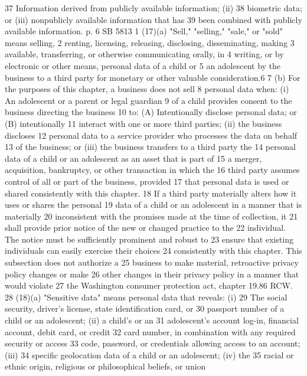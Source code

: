 37 Information derived from publicly available information; (ii)
38 biometric data; or (iii) nonpublicly available information that has
39 been combined with publicly available information.
p. 6 SB 5813
1 (17)(a) "Sell," "selling," "sale," or "sold" means selling,
2 renting, licensing, releasing, disclosing, disseminating, making
3 available, transferring, or otherwise communicating orally, in
4 writing, or by electronic or other means, personal data of a child or
5 an adolescent by the business to a third party for monetary or other
valuable consideration.6
7 (b) For the purposes of this chapter, a business does not sell
8 personal data when: (i) An adolescent or a parent or legal guardian
9 of a child provides consent to the business directing the business
10 to: (A) Intentionally disclose personal data; or (B) intentionally
11 interact with one or more third parties; (ii) the business discloses
12 personal data to a service provider who processes the data on behalf
13 of the business; or (iii) the business transfers to a third party the
14 personal data of a child or an adolescent as an asset that is part of
15 a merger, acquisition, bankruptcy, or other transaction in which the
16 third party assumes control of all or part of the business, provided
17 that personal data is used or shared consistently with this chapter.
18 If a third party materially alters how it uses or shares the personal
19 data of a child or an adolescent in a manner that is materially
20 inconsistent with the promises made at the time of collection, it
21 shall provide prior notice of the new or changed practice to the
22 individual. The notice must be sufficiently prominent and robust to
23 ensure that existing individuals can easily exercise their choices
24 consistently with this chapter. This subsection does not authorize a
25 business to make material, retroactive privacy policy changes or make
26 other changes in their privacy policy in a manner that would violate
27 the Washington consumer protection act, chapter 19.86 RCW.
28 (18)(a) "Sensitive data" means personal data that reveals: (i)
29 The social security, driver's license, state identification card, or
30 passport number of a child or an adolescent; (ii) a child's or an
31 adolescent's account log-in, financial account, debit card, or credit
32 card number, in combination with any required security or access
33 code, password, or credentials allowing access to an account; (iii)
34 specific geolocation data of a child or an adolescent; (iv) the
35 racial or ethnic origin, religious or philosophical beliefs, or union
